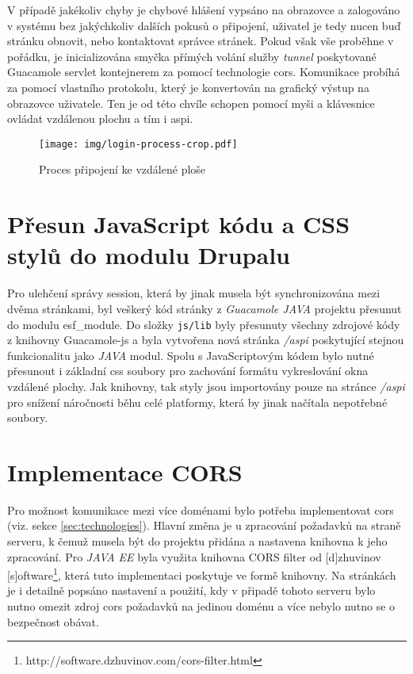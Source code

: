 V případě jakékoliv chyby je chybové hlášení vypsáno na obrazovce a zalogováno v systému bez jakýchkoliv dalších pokusů o připojení, uživatel je tedy nucen buď stránku obnovit, nebo kontaktovat správce stránek. Pokud však vše proběhne v pořádku, je inicializována smyčka přímých volání služby \emph{tunnel} poskytované Guacamole \gls{servlet} kontejnerem za pomocí technologie \gls{cors}. Komunikace probíhá za pomocí vlastního protokolu, který je konvertován na grafický výstup na obrazovce uživatele. Ten je od této chvíle schopen pomocí myši a klávesnice ovládat vzdálenou plochu a tím i \gls{aspi}.

\begin{figure}[]
  \texttt{[image: img/login-process-crop.pdf]}
  \caption{Proces připojení ke vzdálené ploše}
  \label{fig:login_process}
\end{figure}  

\section{Přesun JavaScript kódu a CSS stylů do modulu Drupalu}
Pro ulehčení správy \gls{session}, která by jinak musela být synchronizována mezi dvěma stránkami, byl veškerý kód stránky z \emph{Guacamole JAVA} projektu přesunut do modulu esf\_module. Do složky \texttt{js/lib} byly přesunuty všechny zdrojové kódy z knihovny Guacamole-js a byla vytvořena nová stránka \emph{/aspi} poskytující stejnou funkcionalitu jako \emph{JAVA} modul. Spolu s JavaScriptovým kódem bylo nutné přesunout i základní \gls{css} soubory pro zachování formátu vykreslování okna vzdálené plochy. Jak knihovny, tak styly jsou importovány pouze na stránce \emph{/aspi} pro snížení náročnosti běhu celé platformy, která by jinak načítala nepotřebné soubory. 

\section{Implementace CORS}
Pro možnost komunikace mezi více doménami bylo potřeba implementovat \gls{cors} (viz. sekce \ref{sec:technologies}). Hlavní změna je u zpracování požadavků na straně serveru, k čemuž musela být do projektu přidána a nastavena knihovna k jeho zpracování. Pro \emph{JAVA EE} byla využita knihovna CORS filter od [d]zhuvinov  [s]oftware\footnote{http://software.dzhuvinov.com/cors-filter.html}, která tuto implementaci poskytuje ve formě knihovny. Na stránkách je i detailně popsáno nastavení a použití, kdy v připadě tohoto serveru bylo nutno omezit zdroj \gls{cors} požadavků na jedinou doménu a více nebylo nutno se o bezpečnost obávat.

